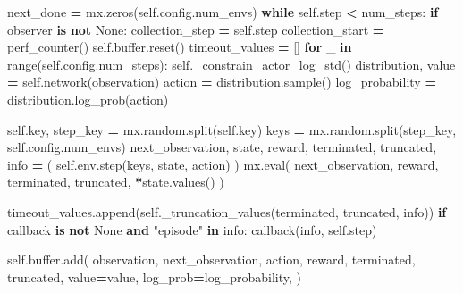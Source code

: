 \documentclass[
  chinese,
  11pt,
  letterpaper,
]{article}
\newenvironment{Shaded}{\begin{snugshade}}{\end{snugshade}}
\newcommand{\BuiltInTok}[1]{#1}
\newcommand{\ControlFlowTok}[1]{\textcolor[rgb]{0.13,0.29,0.53}{\textbf{#1}}}
\newcommand{\KeywordTok}[1]{\textcolor[rgb]{0.13,0.29,0.53}{\textbf{#1}}}
\newcommand{\NormalTok}[1]{#1}
\newcommand{\OperatorTok}[1]{\textcolor[rgb]{0.81,0.36,0.00}{\textbf{#1}}}
\newcommand{\StringTok}[1]{\textcolor[rgb]{0.31,0.60,0.02}{#1}}
\newcommand{\VariableTok}[1]{\textcolor[rgb]{0.00,0.00,0.00}{#1}}
\renewenvironment{Shaded}{\par\smallskip}{\par\smallskip}
\begin{document}
\begin{Shaded}
\begin{Highlighting}[]
\NormalTok{        next\_done }\OperatorTok{=}\NormalTok{ mx.zeros(}\VariableTok{self}\NormalTok{.config.num\_envs)}
        \ControlFlowTok{while} \VariableTok{self}\NormalTok{.step }\OperatorTok{\textless{}}\NormalTok{ num\_steps:}
            \ControlFlowTok{if}\NormalTok{ observer }\KeywordTok{is} \KeywordTok{not} \VariableTok{None}\NormalTok{:}
\NormalTok{                collection\_step }\OperatorTok{=} \VariableTok{self}\NormalTok{.step}
\NormalTok{                collection\_start }\OperatorTok{=}\NormalTok{ perf\_counter()}
            \VariableTok{self}\NormalTok{.}\BuiltInTok{buffer}\NormalTok{.reset()}
\NormalTok{            timeout\_values }\OperatorTok{=}\NormalTok{ []}
            \ControlFlowTok{for}\NormalTok{ \_ }\KeywordTok{in} \BuiltInTok{range}\NormalTok{(}\VariableTok{self}\NormalTok{.config.num\_steps):}
                \VariableTok{self}\NormalTok{.\_constrain\_actor\_log\_std()}
\NormalTok{                distribution, value }\OperatorTok{=} \VariableTok{self}\NormalTok{.network(observation)}
\NormalTok{                action }\OperatorTok{=}\NormalTok{ distribution.sample()}
\NormalTok{                log\_probability }\OperatorTok{=}\NormalTok{ distribution.log\_prob(action)}

                \VariableTok{self}\NormalTok{.key, step\_key }\OperatorTok{=}\NormalTok{ mx.random.split(}\VariableTok{self}\NormalTok{.key)}
\NormalTok{                keys }\OperatorTok{=}\NormalTok{ mx.random.split(step\_key, }\VariableTok{self}\NormalTok{.config.num\_envs)}
\NormalTok{                next\_observation, state, reward, terminated, truncated, info }\OperatorTok{=}\NormalTok{ (}
                    \VariableTok{self}\NormalTok{.env.step(keys, state, action)}
\NormalTok{                )}
\NormalTok{                mx.}\BuiltInTok{eval}\NormalTok{(}
\NormalTok{                    next\_observation, reward, terminated, truncated, }\OperatorTok{*}\NormalTok{state.values()}
\NormalTok{                )}

\NormalTok{                timeout\_values.append(}\VariableTok{self}\NormalTok{.\_truncation\_values(terminated, truncated, info))}
                \ControlFlowTok{if}\NormalTok{ callback }\KeywordTok{is} \KeywordTok{not} \VariableTok{None} \KeywordTok{and} \StringTok{"episode"} \KeywordTok{in}\NormalTok{ info:}
\NormalTok{                    callback(info, }\VariableTok{self}\NormalTok{.step)}

                \VariableTok{self}\NormalTok{.}\BuiltInTok{buffer}\NormalTok{.add(}
\NormalTok{                    observation,}
\NormalTok{                    next\_observation,}
\NormalTok{                    action,}
\NormalTok{                    reward,}
\NormalTok{                    terminated,}
\NormalTok{                    truncated,}
\NormalTok{                    value}\OperatorTok{=}\NormalTok{value,}
\NormalTok{                    log\_prob}\OperatorTok{=}\NormalTok{log\_probability,}
\NormalTok{                )}


\end{Highlighting}
\end{Shaded}
\end{document}
